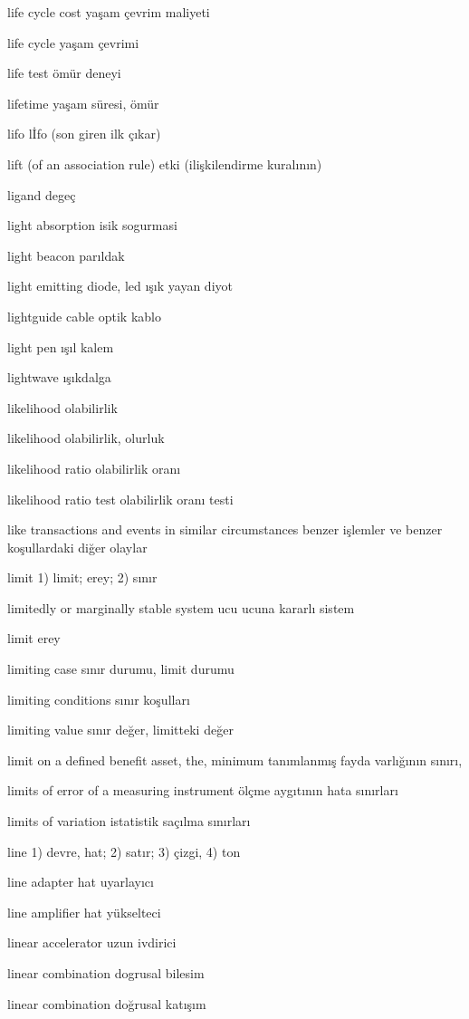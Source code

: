 \documentclass[12pt,fleqn]{article}\usepackage{../../common}
\begin{document}
life cycle cost yaşam çevrim maliyeti

life cycle yaşam çevrimi

life test ömür deneyi

lifetime yaşam süresi, ömür

lifo lİfo (son giren ilk çıkar)

lift (of an association rule) etki (ilişkilendirme kuralının)

ligand degeç

light absorption isik sogurmasi

light beacon parıldak

light emitting diode, led ışık yayan diyot

lightguide cable optik kablo

light pen ışıl kalem

lightwave ışıkdalga

likelihood olabilirlik

likelihood olabilirlik, olurluk

likelihood ratio olabilirlik oranı

likelihood ratio test olabilirlik oranı testi

like transactions and events in similar circumstances benzer işlemler ve benzer koşullardaki diğer olaylar

limit 1) limit; erey; 2) sınır

limitedly or marginally stable system ucu ucuna kararlı sistem

limit erey

limiting case sınır durumu, limit durumu

limiting conditions sınır koşulları

limiting value sınır değer, limitteki değer

limit on a defined benefit asset, the, minimum tanımlanmış fayda varlığının sınırı,

limits of error of a measuring instrument ölçme aygıtının hata sınırları

limits of variation istatistik saçılma sınırları

line 1) devre, hat; 2) satır; 3) çizgi, 4) ton

line adapter hat uyarlayıcı

line amplifier hat yükselteci

linear accelerator uzun ivdirici

linear combination dogrusal bilesim

linear combination doğrusal katışım
\end{document}
